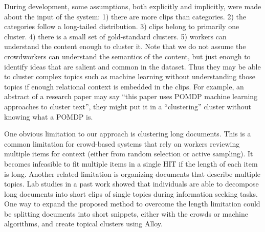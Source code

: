 During development, some assumptions, both explicitly
and implicitly, were made about the input of the system:
1) there are more clips than categories.
2) the categories follow a long-tailed distribution.
3) clips belong to primarily one cluster.
4) there is a small set of gold-standard clusters.
5) workers can understand the content enough to cluster it.
Note that we do not assume the crowdworkers can understand the semantics of the
content, but just enough to identify ideas that are salient and common in the
dataset.
Thus they may be able to cluster complex topics such as machine learning without
understanding those topics if enough relational context is embedded in the clips.
For example, an abstract of a research paper may say ``this paper uses POMDP
machine learning
approaches to cluster text'', they might put it in a ``clustering''
cluster without
knowing what a POMDP is.

% 

One obvious limitation to our approach is clustering long documents.
This is a common limitation for crowd-based systems that rely
on workers reviewing multiple items for context
(either from random selection or active sampling). It becomes infeasible to fit multiple
items in a single HIT if the length of each item is long.
Another related limitation is organizing documents that describe multiple topics. 
Lab studies in a past work \cite{kittur2013costs}
showed that individuals are able to decompose long
documents into short clips of single topics during information seeking tasks. 
One way to expand the
proposed method to overcome the length limitation could be splitting documents into short
snippets, either with the crowds or machine algorithms,
and create topical clusters using Alloy.


